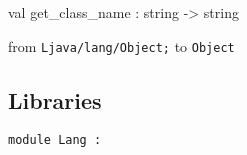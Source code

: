 \documentclass[11pt]{article}
\begin{document}
\label{val:Java.get-underscoreclass-underscorename}\begin{ocamldoccode}
val get_class_name : string -> string
\end{ocamldoccode}
\begin{ocamldocdescription}
from {\tt{Ljava/lang/Object;}} to {\tt{Object}}


\end{ocamldocdescription}




\subsection{Libraries}




\begin{ocamldoccode}
{\tt{module }}{\tt{Lang}}{\tt{ : }}\end{ocamldoccode}
\label{module:Java.Lang}
\end{document}
